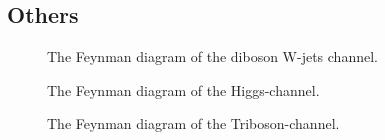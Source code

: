 \subsection{Others}

\begin{figure}
    \centering
    \caption{The Feynman diagram of the diboson W-jets channel.}
    \label{fig:w_pjets}
\end{figure}
\begin{figure}
    \centering
    \caption{The Feynman diagram of the Higgs-channel.}
    \label{fig:h}
\end{figure}
\begin{figure}
    \centering
    \caption{The Feynman diagram of the Triboson-channel.}
    \label{fig:zzz}
\end{figure}
